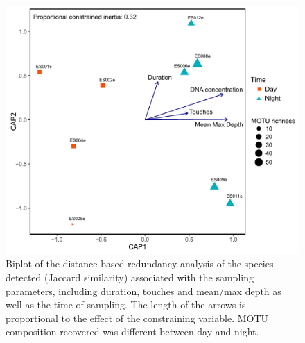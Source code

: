 \documentclass[journal=esthag,manuscript=article, layout=traditional, email=true]{achemso} %
\begin{document}
\begin{figure}[tbh]
    \centering
    \includegraphics[width=0.75\linewidth]{figures/S6_dbRDA_mod.pdf}
    \caption{Biplot of the distance-based redundancy analysis of the species detected (Jaccard similarity) associated with the sampling parameters, including duration, touches and mean/max depth as well as the time of sampling. The length of the arrows is proportional to the effect of the constraining variable. MOTU composition recovered was different between day and night.}
    \label{fig:s5-dbra}
\end{figure}
\end{document}
